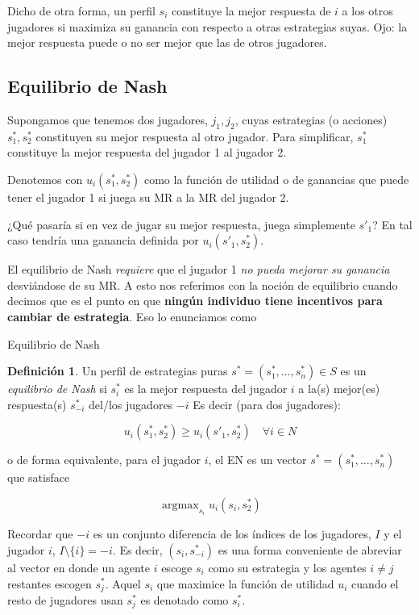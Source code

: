 \documentclass[12pt]{scrartcl}
\theoremstyle{definition}
\newtheorem{defi}{Definición}[section]
\DeclareMathOperator*{\argmax}{argmax}
\begin{document}
Dicho de otra forma, un perfil $s_i$ constituye la mejor respuesta de $i$ a los otros jugadores si maximiza su ganancia con respecto a otras estrategias suyas. Ojo: la mejor respuesta puede o no ser mejor que las de otros jugadores. 

\subsection{Equilibrio de Nash}

Supongamos que tenemos dos jugadores, $j_1, j_2$, cuyas estrategias (o acciones) $s_1^*, s_2^*$ constituyen su mejor respuesta al otro jugador. Para simplificar, $s_1^*$ constituye la mejor respuesta del jugador 1 al jugador 2. 

Denotemos con $u_i(s_1^*, s_2^*)$ como la función de utilidad o de ganancias que puede tener el jugador 1 si juega su MR a la MR del jugador 2. 

¿Qué pasaría si en vez de jugar su mejor respuesta, juega simplemente $s'_1$? En tal caso tendría una ganancia definida por $u_i(s'_1, s_2^*)$.

El equilibrio de Nash \textit{requiere} que el jugador 1 \textit{no pueda mejorar su ganancia} desviándose de su MR. A esto nos referimos con la noción de equilibrio cuando decimos que es el punto en que \textbf{ningún individuo tiene incentivos para cambiar de estrategia}. Eso lo enunciamos como

\begin{mybox}{Equilibrio de Nash}
	\begin{defi}
		Un perfil de estrategias puras $s^*=(s_1^*, ..., s_n^*) \in S$ es un \textit{equilibrio de Nash} si $s_i^*$ es la mejor respuesta del jugador $i$ a la(s) mejor(es) respuesta(s) $s_{-i}^*$ del/los jugadores $-i$
	 Es decir (para dos jugadores):
	 
		\[u_i(s_1^*, s_2^*)\geq u_i(s'_1, s_2^*)\quad \forall i \in N\]
		
		o de forma equivalente, para el jugador $i$, el EN es un vector $s^*=(s_1^*, ..., s_n^*)$ que satisface
		
		\[ \argmax_{s_i}u_i(s_i, s_2^*)\]
		
	\end{defi}
\end{mybox}

Recordar que $-i$ es un conjunto diferencia de los índices de los jugadores, $I$ y el jugador $i$, $I\setminus\{i\}=-i$. Es decir, $(s_i, s_{-i}^*)$ es una forma conveniente de abreviar al vector en donde un agente $i$ escoge $s_i$ como su estrategia y los agentes $i \neq j$ restantes escogen $s_j^*$. Aquel $s_i$ que maximice la función de utilidad $u_i$ cuando el resto de jugadores usan $s_j^*$ es denotado como $s_i^*$.
\end{document}
